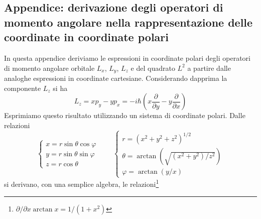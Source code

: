 \subsection{Appendice: derivazione degli operatori di momento angolare nella rappresentazione delle coordinate in coordinate polari}
In questa appendice deriviamo le espressioni in coordinate polari degli operatori di momento angolare orbitale $L_x$, $L_y$, $L_z$ e del quadrato $L^2$ a partire dalle analoghe espressioni in coordinate cartesiane. Considerando dapprima la componente $L_z$ si ha
\begin{equation}
L_z= xp_y - yp_x =-i\hbar \left(x\frac{\partial}{\partial y}- y\frac{\partial}{\partial x}\right)
\label{eq:cap17_11}
\end{equation}
Esprimiamo questo risultato utilizzando un sistema di coordinate polari. Dalle relazioni
\begin{equation}
\begin{cases}
x=r\sin \theta \cos \varphi \\
y=r\sin \theta \sin \varphi \\
z= r\cos\theta
\end{cases}
\qquad
\begin{cases}
r=(x^2+y^2+z^2)^{1/2} \\
\theta=\arctan\left(\sqrt{(x^2+y^2)/z^2}\right) \\
\varphi= \arctan \left(y/x\right)
\end{cases}
\end{equation}
si derivano, con una semplice algebra, le relazioni\footnote{$\partial/\partial x \arctan x = 1/(1+x^2)$}
